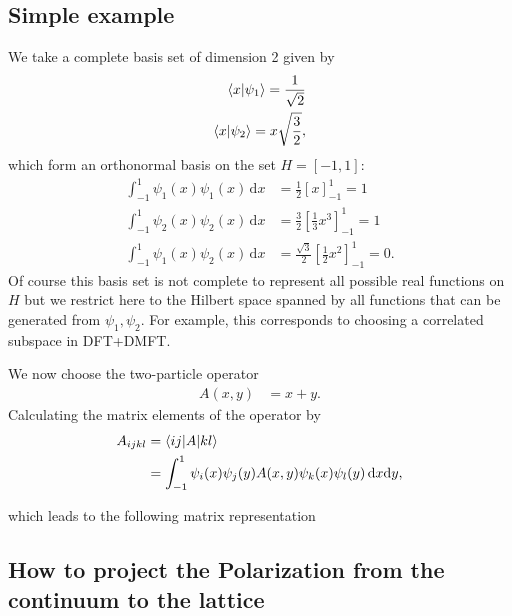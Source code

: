 \documentclass[12pt,a4paper]{scrartcl}
\numberwithin{equation}{section}
\begin{document}
\subsection{Simple example}
We take a complete basis set of dimension 2 given by
\begin{align}
 \braket{x | \psi_1 } = \frac{1}{\sqrt{2}} \\
 \braket{x | \psi_2 } = x\sqrt{\frac{3}{2}}, 
\end{align}
which form an orthonormal basis on the set $H= [-1,1]$:
\begin{align}
 \int_{-1}^{1} \psi_1(x)\psi_1(x) \, \mathrm{d}x
 &= \frac{1}{2} [ x ]_{-1}^1 = 1 \\
%
 \int_{-1}^{1} \psi_2(x)\psi_2(x) \, \mathrm{d}x
 &= \frac{3}{2} \left[\frac{1}{3} x^3 \right]_{-1}^1 = 1 \\
%
 \int_{-1}^{1} \psi_1(x)\psi_2(x) \, \mathrm{d}x
 &= \frac{\sqrt{3}}{2} \left[\frac{1}{2}x^2 \right]_{-1}^1 = 0 .
\end{align}
Of course this basis set is not complete to represent
all possible real functions on $H$ but we restrict here to 
the Hilbert space spanned by all functions that 
can be generated from $\psi_1,\psi_2$. For example, this corresponds
to choosing a correlated subspace in DFT+DMFT.

We now choose the two-particle operator
\begin{align}
A(x,y) &= x+y.
\end{align}
Calculating the matrix elements of the operator by
\begin{align}
 A_{ijkl} &= \braket{ij|A|kl} \\
 &= \int_{-1}^{1} \psi_i(x) \psi_j(y) A(x,y) \psi_k(x) \psi_l(y) \, \mathrm{d}x\mathrm{d}y,
\end{align}

which leads to the following matrix representation



\subsection{How to project the Polarization from the continuum to the lattice}
\end{document}
